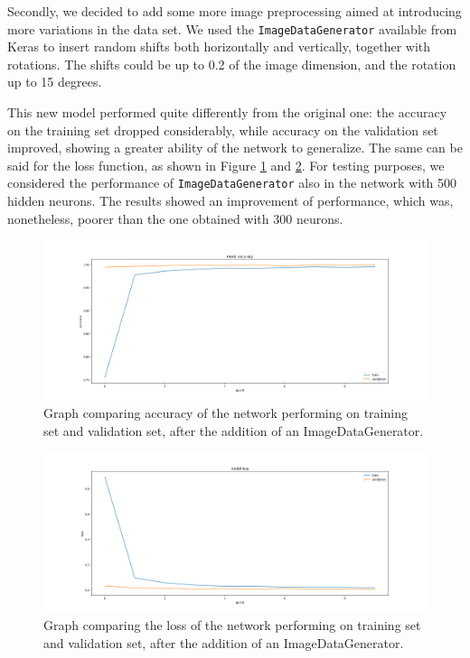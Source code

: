 Secondly, we decided to add some more image preprocessing aimed at introducing more variations in the data set. We used the \texttt{ImageDataGenerator} available from Keras to insert random shifts both horizontally and vertically, together with rotations. The shifts could be up to 0.2 of the image dimension, and the rotation up to 15 degrees.

This new model performed quite differently from the original one: the accuracy on the training set dropped considerably, while accuracy on the validation set improved, showing a greater ability of the network to generalize. The same can be said for the loss function, as shown in Figure \ref{fig5-300dig-acc} and \ref{fig6-300dig-loss}. For testing purposes, we considered the performance of \texttt{ImageDataGenerator} also in the network with 500 hidden neurons. The results showed an improvement of performance, which was, nonetheless, poorer than the one obtained with 300 neurons.

\begin{figure}
	\centering
	\begin{minipage}{0.9\textwidth}
		\centering
		\includegraphics[width=1\textwidth]{300dig-acc_1.png}
	\end{minipage}
	\caption{Graph comparing accuracy of the network performing on training set and validation set, after the addition of an ImageDataGenerator.}
	\label{fig5-300dig-acc}
\end{figure}
\begin{figure}
	\centering
	\begin{minipage}{0.9\textwidth}
		\centering
		\includegraphics[width=1\textwidth]{300dig-loss_1.png} 
	\end{minipage}
	\caption{Graph comparing the loss of the network performing on training set and validation set, after the addition of an ImageDataGenerator.}
	\label{fig6-300dig-loss}
\end{figure}

